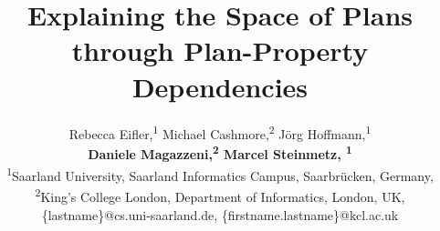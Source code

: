 \documentclass{article}
\begin{document}
\title{Explaining the Space of Plans through Plan-Property Dependencies}


\author{
Rebecca Eifler,\textsuperscript{\rm 1} 
Michael Cashmore,\textsuperscript{\rm 2}
J\"org Hoffmann,\textsuperscript{\rm 1}\\
\Large \textbf{Daniele Magazzeni,\textsuperscript{\rm 2} 
Marcel Steinmetz, \textsuperscript{\rm 1}} \\
\textsuperscript{\rm 1}Saarland University, Saarland Informatics Campus, Saarbr\"ucken, Germany,\\ 
\textsuperscript{\rm 2}King's College London, Department of Informatics, London, UK,\\ 
\{lastname\}@cs.uni-saarland.de,
\{firstname.lastname\}@kcl.ac.uk 
}

%

\maketitle
\end{document}
